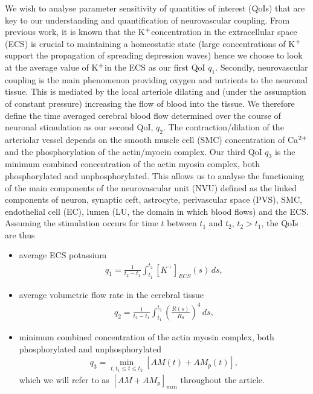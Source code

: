 \documentclass[smallextended]{svjour3}
\numberwithin{equation}{section}
\newcommand{\ca}{Ca$^{\text{\scriptsize 2+}}$}
\newcommand{\pot}{K$^{\text{\scriptsize +}}$}
\begin{document}
 We wish to analyse parameter sensitivity of quantities of interest (QoIs) that are key to our understanding and quantification of  neurovascular coupling.   From previous work, it is known that the \pot concentration in the extracellular space (ECS) is crucial to maintaining a homeostatic state (large concentrations of \pot support the propagation of spreading depression waves) hence we choose to look at the average value of \pot in the ECS as our first QoI $q_1$. Secondly, neurovascular coupling is the main phenomenon providing oxygen and nutrients to the neuronal tissue. This is mediated by the local arteriole dilating and (under the assumption of constant pressure) increasing the flow of blood into the tissue. We therefore define the time averaged cerebral blood flow determined over the course of neuronal stimulation as our second QoI, $q_2$. The contraction/dilation of the arteriolar vessel  depends on the smooth muscle cell (SMC) concentration of \ca and the phosphorylation of the actin/myocin complex. Our third QoI $q_3$ is the minimum combined concentration of the actin myosin complex, both phosphorylated and unphosphorylated. This allows us to analyse the functioning of the main components of the neurovascular unit (NVU) defined as the linked components of neuron, synaptic ceft, astrocyte, perivascular space (PVS), SMC, endothelial cell (EC), lumen (LU, the domain in which blood flows) and the ECS. 
  Assuming the stimulation occurs for time $t$ between $t_1$ and $t_2$, $t_2>t_1$,  the QoIs are thus
 \begin{itemize}
\item average ECS potassium 
\begin{eqnarray}
 q_1 = \frac{1}{t_2-t_1}\int_{t_1}^{t_2}[K^+]_{ECS}(s)\, ds, \label{K_ECS_Mean}
\end{eqnarray}
\item average volumetric flow rate in the cerebral tissue
\begin{eqnarray}
 q_2 = \frac{1}{t_2-t_1}\int_{t_1}^{t_2}\left(\frac{R(s)}{R_0}\right)^4\, ds, \label{vol_flow}
\end{eqnarray}
 \item minimum combined concentration of the actin myosin complex, both phosphorylated and unphosphorylated
\begin{eqnarray}
q_3 = \min _{t, t_1\le t \le t_2} [AM(t)+AM_p(t)], \label{AM_AMp_Min}
\end{eqnarray}
which we will refer to as $[AM+AM_p]_{min}$ throughout the article.
\end{itemize}
\end{document}
